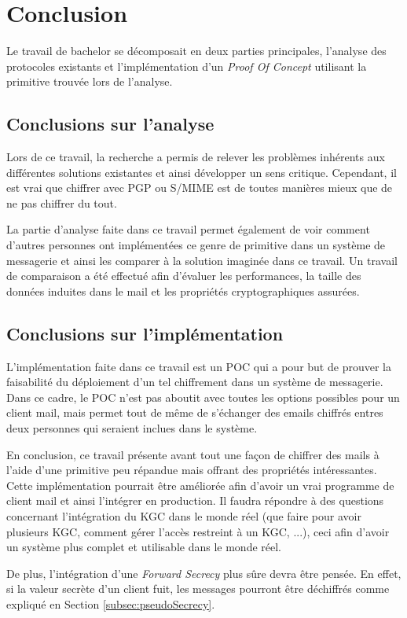 \chapter{Conclusion}
\label{ch:conclusion}
Le travail de bachelor se décomposait en deux parties principales, l'analyse des protocoles existants et l'implémentation d'un \textit{Proof Of Concept} utilisant la primitive trouvée lors de l'analyse.
\section{Conclusions sur l'analyse}
Lors de ce travail, la recherche a permis de relever les problèmes inhérents aux différentes solutions existantes et ainsi développer un sens critique. Cependant, il est vrai que chiffrer avec PGP ou S/MIME est de toutes manières mieux que de ne pas chiffrer du tout.

La partie d'analyse faite dans ce travail permet également de voir comment d'autres personnes ont implémentées ce genre de primitive dans un système de messagerie et ainsi les comparer à la solution imaginée dans ce travail. Un travail de comparaison a été effectué afin d'évaluer les performances, la taille des données induites dans le mail et les propriétés cryptographiques assurées.

\section{Conclusions sur l'implémentation}
L'implémentation faite dans ce travail est un POC qui a pour but de prouver la faisabilité du déploiement d'un tel chiffrement dans un système de messagerie. Dans ce cadre, le POC n'est pas aboutit avec toutes les options possibles pour un client mail, mais permet tout de même de s'échanger des emails chiffrés entres deux personnes qui seraient inclues dans le système.

En conclusion, ce travail présente avant tout une façon de chiffrer des mails à l'aide d'une primitive peu répandue mais offrant des propriétés intéressantes. Cette implémentation pourrait être améliorée afin d'avoir un vrai programme de client mail et ainsi l'intégrer en production. Il faudra répondre à des questions concernant l'intégration du KGC dans le monde réel (que faire pour avoir plusieurs KGC, comment gérer l'accès restreint à un KGC, ...), ceci afin d'avoir un système plus complet et utilisable dans le monde réel.

De plus, l'intégration d'une \textit{Forward Secrecy} plus sûre devra être pensée. En effet, si la valeur secrète d'un client fuit, les messages pourront être déchiffrés comme expliqué en Section \ref{subsec:pseudoSecrecy}.

